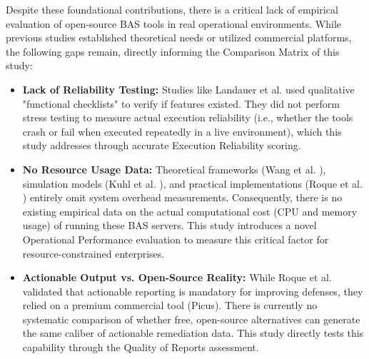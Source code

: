 Despite these foundational contributions, there is a critical lack of empirical evaluation of open-source BAS tools in real operational environments. While previous studies established theoretical needs or utilized commercial platforms, the following gaps remain, directly informing the Comparison Matrix of this study:
\begin{itemize}
    \item \textbf{Lack of Reliability Testing:} Studies like Landauer et al. \cite{landauer2024} used qualitative "functional checklists" to verify if features existed. They did not perform stress testing to measure actual execution reliability (i.e., whether the tools crash or fail when executed repeatedly in a live environment), which this study addresses through accurate Execution Reliability scoring.
    \item \textbf{No Resource Usage Data:} Theoretical frameworks (Wang et al. \cite{wang2025}), simulation models (Kuhl et al. \cite{kuhl2007}), and practical implementations (Roque et al. \cite{roque2024}) entirely omit system overhead measurements. Consequently, there is no existing empirical data on the actual computational cost (CPU and memory usage) of running these BAS servers. This study introduces a novel Operational Performance evaluation  to measure this critical factor for resource-constrained enterprises.
    \item \textbf{Actionable Output vs. Open-Source Reality:} While Roque et al. \cite{roque2024} validated that actionable reporting is mandatory for improving defenses, they relied on a premium commercial tool (Picus). There is currently no systematic comparison of whether free, open-source alternatives can generate the same caliber of actionable remediation data. This study directly tests this capability through the Quality of Reports assessment.
\end{itemize}

